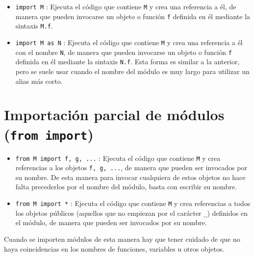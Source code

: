 \documentclass[
  spanish,
  a4paper,
]{scrreport}
\begin{document}
\begin{itemize}
\item
  \texttt{import\ M} : Ejecuta el código que contiene \texttt{M} y crea
  una referencia a él, de manera que pueden invocarse un objeto o
  función \texttt{f} definida en él mediante la sintaxis \texttt{M.f}.
\item
  \texttt{import\ M\ as\ N} : Ejecuta el código que contiene \texttt{M}
  y crea una referencia a él con el nombre \texttt{N}, de manera que
  pueden invocarse un objeto o función \texttt{f} definida en él
  mediante la sintaxis \texttt{N.f}. Esta forma es similar a la
  anterior, pero se suele usar cuando el nombre del módulo es muy largo
  para utilizar un alias más corto.
\end{itemize}

\section{\texorpdfstring{Importación parcial de módulos
(\texttt{from\ import})}{Importación parcial de módulos (from import)}}\label{importaciuxf3n-parcial-de-muxf3dulos-from-import}

\begin{itemize}
\item
  \texttt{from\ M\ import\ f,\ g,\ ...} : Ejecuta el código que contiene
  \texttt{M} y crea referencias a los objetos \texttt{f,\ g,\ ...}, de
  manera que pueden ser invocados por su nombre. De esta manera para
  invocar cualquiera de estos objetos no hace falta precederlos por el
  nombre del módulo, basta con escribir su nombre.
\item
  \texttt{from\ M\ import\ *} : Ejecuta el código que contiene
  \texttt{M} y crea referencias a todos los objetos públicos (aquellos
  que no empiezan por el carácter \texttt{\_}) definidos en el módulo,
  de manera que pueden ser invocados por su nombre.
\end{itemize}

\begin{tcolorbox}[enhanced jigsaw, arc=.35mm, bottomrule=.15mm, bottomtitle=1mm, breakable, colback=white, colbacktitle=quarto-callout-warning-color!10!white, colframe=quarto-callout-warning-color-frame, coltitle=black, left=2mm, leftrule=.75mm, opacityback=0, opacitybacktitle=0.6, rightrule=.15mm, title=\textcolor{quarto-callout-warning-color}{\faExclamationTriangle}\hspace{0.5em}{Advertencia}, titlerule=0mm, toprule=.15mm, toptitle=1mm]

Cuando se importen módulos de esta manera hay que tener cuidado de que
no haya coincidencias en los nombres de funciones, variables u otros
objetos.

\end{tcolorbox}
\end{document}
